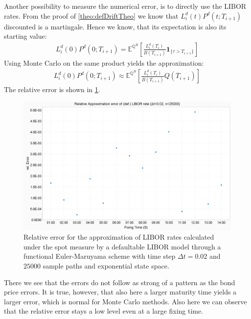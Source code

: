 \documentclass[12pt]{article}
\begin{document}
	Another possibility to measure the numerical error, is to directly use the LIBOR rates. From the proof of \cref{theo:defDriftTheo} we know that $L^d_i(t)P^d(t;T_{i+1})$ discounted is a martingale. Hence we know, that its expectation is also its starting value:
	\begin{align*}
		L^d_i(0)P^d(0;T_{i+1}) = \mathbb{E}^{\mathbb{Q}^B}\left[\frac{L^d_i\left(T_{i}\right)}{B(T_{i+1})}\mathbf{1}_{\{\tau > T_{i+1}\}}\right]
	\end{align*}
	Using Monte Carlo on the same product yields the approximation:
	\begin{align*}
		L^d_i(0)P^d(0;T_{i+1}) \approx \mathbb{E}^{\mathbb{Q}^B}\left[\frac{L^d_i\left(T_{i}\right)}{B(T_{i+1})}Q\left(T_{i+1}\right)\right]
	\end{align*}
	The relative error is shown in \cref{fig:liborerrorrel}.
	\begin{figure}[h!]
		\centering
		\includegraphics[width=0.7\linewidth]{figures/Today/LIBORError_rel}
		\caption{Relative error for the approximation of LIBOR rates calculated under the spot measure by a defaultable LIBOR model through a functional Euler-Maruyama scheme with time step $\Delta t=0.02$ and $25000$ sample paths and exponential state space.}
		\label{fig:liborerrorrel}
	\end{figure}
	There we see that the errors do not follow as strong of a pattern as the bond price errors. It is true, however, that also here a larger maturity time yields a larger error, which is normal for Monte Carlo methods. Also here we can observe that the relative error stays a low level even at a large fixing time.
	
	
\end{document}
